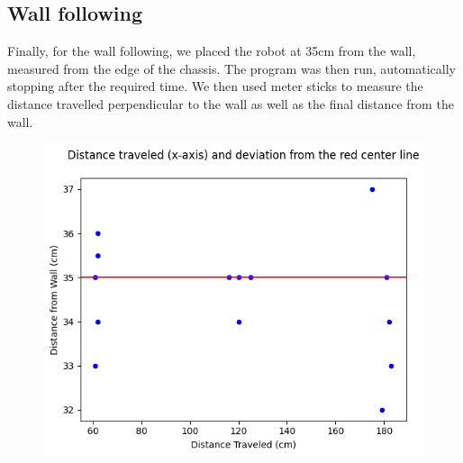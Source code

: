 \documentclass[11pt]{article}
\begin{document}
\subsection*{Wall following}

Finally, for the wall following, we placed the robot at 35cm from the wall, measured from the edge of the chassis. The program was then run, automatically stopping after the required time. We then used meter sticks to measure the distance travelled perpendicular to the wall as well as the final distance from the wall.

\begin{figure}[h!]
\includegraphics[width=120mm]{wall.png}
\centering
\end{figure}

\end{document}
